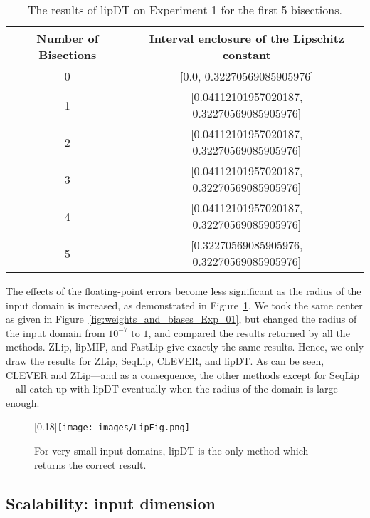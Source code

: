 \documentclass[11pt,times]{article}
\begin{document}
\label{page:lipDT_bisection}

\begin{table*}
  \centering
  \begin{tabular}{|c|c|} \hline
    Number of Bisections & Interval enclosure of the Lipschitz constant \\ \hline \hline
    0 & [0.0, 0.32270569085905976]\\ \hline
    1 & [0.04112101957020187, 0.32270569085905976]\\ \hline
    2 & [0.04112101957020187, 0.32270569085905976] \\ \hline
    3 & [0.04112101957020187, 0.32270569085905976]\\ \hline
    4 &  [0.04112101957020187, 0.32270569085905976]\\ \hline
    5 & [0.32270569085905976, 0.32270569085905976]    \\ \hline
  \end{tabular}
  \caption[Results of each bisection]{The results of lipDT on
    Experiment 1 for the first 5 bisections.}
  \label{tab:exp_01_bisections}
\end{table*}



The effects of the floating-point errors become less significant as
the radius of the input domain is increased, as demonstrated in
Figure~\ref{fig:accuracy_comparison_radius}. We took the same center
as given in Figure~\ref{fig:weights_and_biases_Exp_01}, but changed
the radius of the input domain from $10^{-7}$ to $1$, and compared the
results returned by all the methods. ZLip, lipMIP, and FastLip give
exactly the same results. Hence, we only draw the results for ZLip,
SeqLip, \ac{CLEVER}, and lipDT. As can be seen, \ac{CLEVER} and
ZLip---and as a consequence, the other methods except for SeqLip---all
catch up with lipDT eventually when the radius of the domain is large
enough.

\begin{figure}[t]
  	\centering
	\scalebox{0.2}[0.18]{\texttt{[image: images/LipFig.png]}} 
	\caption{For very small input domains, lipDT is the only
          method which returns the correct result.}
	\label{fig:accuracy_comparison_radius}
\end{figure}



\subsection{Scalability: input dimension}
\label{subsec:scalability:input_dim}
\end{document}
